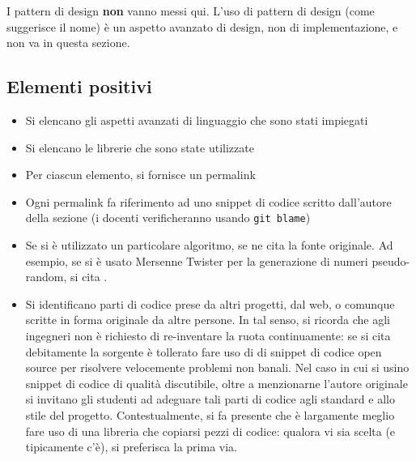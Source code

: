 \documentclass[a4paper,12pt]{report}
\begin{document}
	I pattern di design \textbf{non} vanno messi qui.
	L'uso di pattern di design (come suggerisce il nome) è un aspetto avanzato di design, non di implementazione,
	e non va in questa sezione.
	
	\subsection*{Elementi positivi}
	
	\begin{itemize}
		\item Si elencano gli aspetti avanzati di linguaggio che sono stati impiegati
		\item Si elencano le librerie che sono state utilizzate
		\item Per ciascun elemento, si fornisce un permalink
		\item Ogni permalink fa riferimento ad uno snippet di codice scritto dall'autore della sezione (i docenti verificheranno usando \texttt{git blame})
		\item Se si è utilizzato un particolare algoritmo, se ne cita la fonte originale.
		Ad esempio, se si è usato Mersenne Twister per la generazione di numeri pseudo-random, si cita \cite{mersenne}.
		\item Si identificano parti di codice prese da altri progetti, dal web, o comunque scritte in forma originale da altre persone.
		In tal senso, si ricorda che agli ingegneri non è richiesto di re-inventare la ruota continuamente:
		se si cita debitamente la sorgente è tollerato fare uso di di snippet di codice open source per risolvere velocemente problemi non banali.
		Nel caso in cui si usino snippet di codice di qualità discutibile,
		oltre a menzionarne l'autore originale si invitano gli studenti ad adeguare tali parti di codice agli standard e allo stile del progetto.
		Contestualmente, si fa presente che è largamente meglio fare uso di una libreria che copiarsi pezzi di codice:
		qualora vi sia scelta (e tipicamente c'è), si preferisca la prima via.
	\end{itemize}
	
\end{document}
